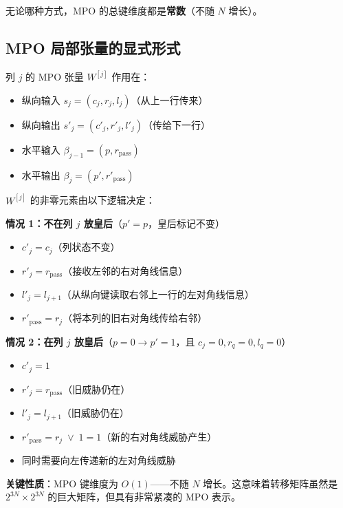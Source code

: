 \documentclass[12pt,a4paper]{ctexart}
\begin{document}
无论哪种方式，MPO 的总键维度都是\textbf{常数}（不随 $N$ 增长）。

\subsection{MPO 局部张量的显式形式}

列 $j$ 的 MPO 张量 $W^{[j]}$ 作用在：
\begin{itemize}
    \item 纵向输入 $s_j = (c_j, r_j, l_j)$（从上一行传来）
    \item 纵向输出 $s'_j = (c'_j, r'_j, l'_j)$（传给下一行）
    \item 水平输入 $\beta_{j-1} = (p, r_{\text{pass}})$
    \item 水平输出 $\beta_j = (p', r'_{\text{pass}})$
\end{itemize}

$W^{[j]}$ 的非零元素由以下逻辑决定：

\begin{tcolorbox}[colback=gray!5, colframe=gray!60, title=MPO 局部张量的逻辑]
\textbf{情况 1：不在列 $j$ 放皇后}（$p' = p$，皇后标记不变）
\begin{itemize}
    \item $c'_j = c_j$（列状态不变）
    \item $r'_j = r_{\text{pass}}$（接收左邻的右对角线信息）
    \item $l'_j = l_{j+1}$（从纵向键读取右邻上一行的左对角线信息）
    \item $r'_{\text{pass}} = r_j$（将本列的旧右对角线传给右邻）
\end{itemize}

\textbf{情况 2：在列 $j$ 放皇后}（$p = 0 \to p' = 1$，且 $c_j = 0, r_q = 0, l_q = 0$）
\begin{itemize}
    \item $c'_j = 1$
    \item $r'_j = r_{\text{pass}}$（旧威胁仍在）
    \item $l'_j = l_{j+1}$（旧威胁仍在）
    \item $r'_{\text{pass}} = r_j \;\lor\; 1 = 1$（新的右对角线威胁产生）
    \item 同时需要向左传递新的左对角线威胁
\end{itemize}
\end{tcolorbox}

\textbf{关键性质}：MPO 键维度为 $O(1)$——不随 $N$ 增长。这意味着转移矩阵虽然是 $2^{3N} \times 2^{3N}$ 的巨大矩阵，但具有非常紧凑的 MPO 表示。
\end{document}
